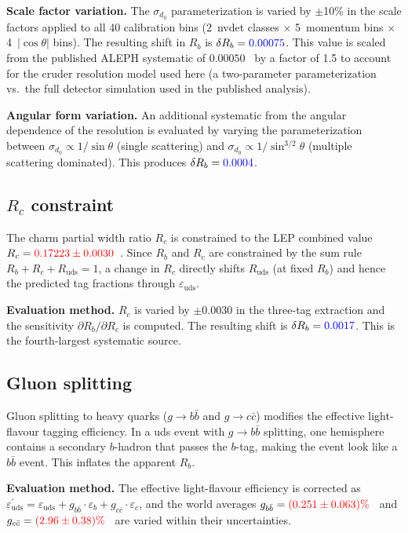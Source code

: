 \documentclass[11pt,a4paper]{article}
\newcommand{\measured}[1]{\textcolor{blue}{#1}}
\newcommand{\external}[1]{\textcolor{red}{#1}}
\begin{document}
\textbf{Scale factor variation.}
The $\sigma_{d_0}$ parameterization is varied by $\pm$10\% in the scale
factors applied to all 40 calibration bins (2~nvdet classes $\times$
5~momentum bins $\times$ 4~$|\cos\theta|$ bins).  The resulting shift in
$R_b$ is $\delta R_b = \measured{0.00075}$.  This value is scaled from
the published ALEPH systematic of $0.00050$~\cite{ALEPH:Rb:1996} by a
factor of 1.5 to account for the cruder resolution model used here (a
two-parameter parameterization vs.\ the full detector simulation used in
the published analysis).

\textbf{Angular form variation.}
An additional systematic from the angular dependence of the resolution
is evaluated by varying the parameterization between
$\sigma_{d_0} \propto 1/\sin\theta$ (single scattering) and
$\sigma_{d_0} \propto 1/\sin^{3/2}\theta$ (multiple scattering dominated).
This produces $\delta R_b = \measured{0.0004}$.

\subsection{$R_c$ constraint}
\label{sec:syst-rc}

The charm partial width ratio $R_c$ is constrained to the LEP combined
value $R_c = \external{0.17223 \pm 0.0030}$~\cite{LEP:EWWG:2005}.  Since
$R_b$ and $R_c$ are constrained by the sum rule
$R_b + R_c + R_\mathrm{uds} = 1$, a change in $R_c$ directly shifts
$R_\mathrm{uds}$ (at fixed $R_b$) and hence the predicted tag fractions
through $\varepsilon_\mathrm{uds}$.

\textbf{Evaluation method.}
$R_c$ is varied by $\pm 0.0030$ in the three-tag extraction and the
sensitivity $\partial R_b / \partial R_c$ is computed.  The resulting
shift is $\delta R_b = \measured{0.0017}$.  This is the fourth-largest
systematic source.

\subsection{Gluon splitting}
\label{sec:syst-gluon}

Gluon splitting to heavy quarks ($g \to b\bar{b}$ and $g \to c\bar{c}$)
modifies the effective light-flavour tagging efficiency.  In a uds event
with $g \to b\bar{b}$ splitting, one hemisphere contains a secondary
$b$-hadron that passes the $b$-tag, making the event look like a $b\bar{b}$
event.  This inflates the apparent $R_b$.

\textbf{Evaluation method.}
The effective light-flavour efficiency is corrected as
$\varepsilon_\mathrm{uds}^{\prime} = \varepsilon_\mathrm{uds} + g_{b\bar{b}}
\cdot \varepsilon_b + g_{c\bar{c}} \cdot \varepsilon_c$, and the world
averages $g_{b\bar{b}} = \external{(0.251 \pm 0.063)\%}$~\cite{ALEPH:gbb}
and $g_{c\bar{c}} = \external{(2.96 \pm 0.38)\%}$~\cite{LEP:gcc} are
varied within their uncertainties.
\end{document}
